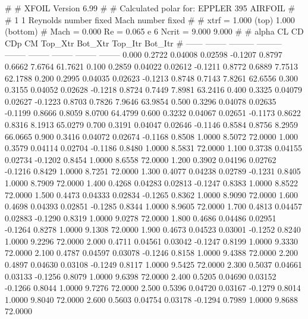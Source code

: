 #  
#       XFOIL         Version 6.99
#  
# Calculated polar for: EPPLER 395 AIRFOIL                              
#  
# 1 1 Reynolds number fixed          Mach number fixed         
#  
# xtrf =   1.000 (top)        1.000 (bottom)  
# Mach =   0.000     Re =     0.065 e 6     Ncrit =   9.000  9.000
#  
#   alpha    CL        CD       CDp       CM     Top_Xtr  Bot_Xtr  Top_Itr  Bot_Itr
#  ------ -------- --------- --------- -------- -------- -------- -------- --------
   0.000   0.2722   0.04008   0.02598  -0.1207   0.8797   0.6662   7.6764  61.7621
   0.100   0.2859   0.04022   0.02612  -0.1211   0.8772   0.6889   7.7513  62.1788
   0.200   0.2995   0.04035   0.02623  -0.1213   0.8748   0.7143   7.8261  62.6556
   0.300   0.3155   0.04052   0.02628  -0.1218   0.8724   0.7449   7.8981  63.2416
   0.400   0.3325   0.04079   0.02627  -0.1223   0.8703   0.7826   7.9646  63.9854
   0.500   0.3296   0.04078   0.02635  -0.1199   0.8666   0.8059   8.0700  64.4799
   0.600   0.3232   0.04067   0.02651  -0.1173   0.8622   0.8316   8.1913  65.0279
   0.700   0.3191   0.04047   0.02646  -0.1146   0.8584   0.8756   8.2959  66.0665
   0.900   0.3416   0.04072   0.02674  -0.1168   0.8508   1.0000   8.5072  72.0000
   1.000   0.3579   0.04114   0.02704  -0.1186   0.8480   1.0000   8.5831  72.0000
   1.100   0.3738   0.04155   0.02734  -0.1202   0.8454   1.0000   8.6558  72.0000
   1.200   0.3902   0.04196   0.02762  -0.1216   0.8429   1.0000   8.7251  72.0000
   1.300   0.4077   0.04238   0.02789  -0.1231   0.8405   1.0000   8.7909  72.0000
   1.400   0.4268   0.04283   0.02813  -0.1247   0.8383   1.0000   8.8522  72.0000
   1.500   0.4473   0.04333   0.02834  -0.1265   0.8362   1.0000   8.9090  72.0000
   1.600   0.4698   0.04393   0.02851  -0.1285   0.8344   1.0000   8.9605  72.0000
   1.700   0.4813   0.04457   0.02883  -0.1290   0.8319   1.0000   9.0278  72.0000
   1.800   0.4686   0.04486   0.02951  -0.1264   0.8278   1.0000   9.1308  72.0000
   1.900   0.4673   0.04523   0.03001  -0.1252   0.8240   1.0000   9.2296  72.0000
   2.000   0.4711   0.04561   0.03042  -0.1247   0.8199   1.0000   9.3330  72.0000
   2.100   0.4787   0.04597   0.03078  -0.1246   0.8158   1.0000   9.4388  72.0000
   2.200   0.4897   0.04630   0.03108  -0.1249   0.8117   1.0000   9.5425  72.0000
   2.300   0.5037   0.04661   0.03133  -0.1256   0.8079   1.0000   9.6398  72.0000
   2.400   0.5205   0.04690   0.03152  -0.1266   0.8044   1.0000   9.7276  72.0000
   2.500   0.5396   0.04720   0.03167  -0.1279   0.8014   1.0000   9.8040  72.0000
   2.600   0.5603   0.04754   0.03178  -0.1294   0.7989   1.0000   9.8688  72.0000
